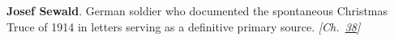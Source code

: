 \textbf{Josef Sewald}. German soldier who documented the spontaneous Christmas Truce of 1914 in letters serving as a definitive primary source. \emph{[Ch.~\hyperref[ch:christmastruce1914]{38}]}

